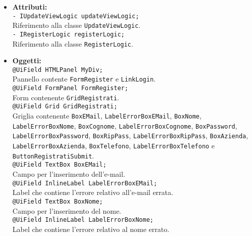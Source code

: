 {\begin{sloppypar}
{\begin{itemize}
\begin{itemize}
			\item[] \textbf{Attributi:}\\
				\texttt{- IUpdateViewLogic updateViewLogic;}\\
				Riferimento alla classe \texttt{UpdateViewLogic}.\\
				
				\texttt{- IRegisterLogic registerLogic;}\\
				Riferimento alla classe \texttt{RegisterLogic}.\\

			\item[] \textbf{Oggetti:}\\
				\texttt{@UiField HTMLPanel MyDiv;}\\
				Pannello contente \texttt{FormRegister} e \texttt{LinkLogin}.\\
				
				\texttt{@UiField FormPanel FormRegister;}\\
				Form contenente \texttt{GridRegistrati}.\\
				
				\texttt{@UiField Grid GridRegistrati;}\\
				Griglia contenente \texttt{BoxEMail}, \texttt{LabelErrorBoxEMail}, \texttt{BoxNome}, \texttt{LabelErrorBoxNome}, \texttt{BoxCognome}, \texttt{LabelErrorBoxCognome}, \texttt{BoxPassword}, \texttt{LabelErrorBoxPassword}, \texttt{BoxRipPass}, \texttt{LabelErrorBoxRipPass}, \texttt{BoxAzienda}, \texttt{LabelErrorBoxAzienda}, \texttt{BoxTelefono}, \texttt{LabelErrorBoxTelefono} e \texttt{ButtonRegistratiSubmit}.\\
				
				\texttt{@UiField TextBox BoxEMail;}\\
				Campo per l'inserimento dell'e-mail.\\
				
				\texttt{@UiField InlineLabel LabelErrorBoxEMail;}\\
				Label che contiene l’errore relativo all’e-mail errata.\\
				
				\texttt{@UiField TextBox BoxNome;}\\
				Campo per l'inserimento del nome.\\
				
				\texttt{@UiField InlineLabel LabelErrorBoxNome;}\\
				Label che contiene l’errore relativo al nome errato.\\


\end{itemize}
\end{itemize}}
\end{sloppypar}}
